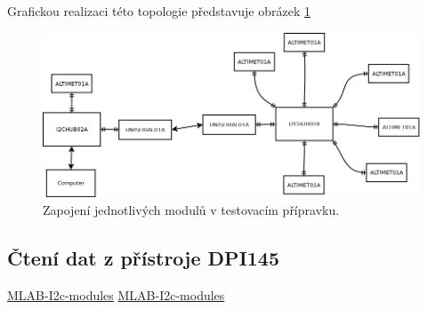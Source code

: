 \documentclass[12pt,a4paper,oneside]{article}
\begin{document}
Grafickou realizaci této topologie představuje obrázek \ref{test_setup_blocks}

\begin{figure} [htbp]
\centering
\includegraphics [width=220mm, angle=90, origin=c] {./img/test_setup.png}
\caption{Zapojení jednotlivých modulů v testovacím přípravku.}
\label{test_setup_blocks}
\end{figure}

\subsection{Čtení dat z přístroje DPI145}


\begin{thebibliography}{99}
\href{https://github.com/MLAB-project/MLAB-I2c-modules}{MLAB-I2c-modules}
\href{svn://svn.mlab.cz/mlab/Modules/Sensors/ALTIMET01A/SW/Python}{MLAB-I2c-modules}
\end{thebibliography}
\end{document}

